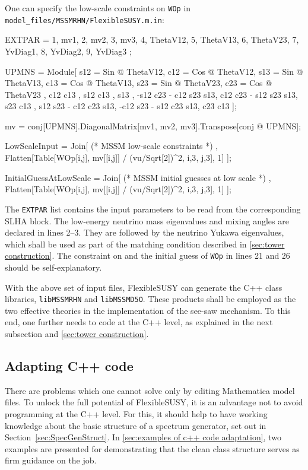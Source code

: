 \documentclass[final,3p,11pt,pdflatex]{elsarticle}
\makeatletter
\newcommand{\fs}{FlexibleSUSY\@\xspace}
\newcommand{\mathematica}{Mathematica\xspace}
\newcommand{\code}[1]{\lstinline|#1|}  %
\newcommand{\secref}[1]{Section~\ref{#1}}
\makeatother
\begin{document}
One can specify the low-scale constraints on \code{WOp}
in \code{model_files/MSSMRHN/FlexibleSUSY.m.in}:
\begin{numlstlisting}
EXTPAR = {
  {1, mv1}, {2, mv2}, {3, mv3},
  {4, ThetaV12}, {5, ThetaV13}, {6, ThetaV23},
  {7, YvDiag1}, {8, YvDiag2}, {9, YvDiag3}
};

UPMNS = Module[{
    s12 = Sin @ ThetaV12, c12 = Cos @ ThetaV12,
    s13 = Sin @ ThetaV13, c13 = Cos @ ThetaV13,
    s23 = Sin @ ThetaV23, c23 = Cos @ ThetaV23
  },
  {{  c12 c13              ,  s12 c13              , s13     },
   { -s12 c23 - c12 s23 s13,  c12 c23 - s12 s23 s13, s23 c13 },
   {  s12 s23 - c12 c23 s13, -c12 s23 - s12 c23 s13, c23 c13 }}
];

mv = conj[UPMNS].DiagonalMatrix[{mv1, mv2, mv3}].Transpose[conj @ UPMNS];

LowScaleInput = Join[
  { (* MSSM low-scale constraints *) },
  Flatten[Table[{WOp[i,j], mv[[i,j]] / (vu/Sqrt[2])^2}, {i,3}, {j,3}], 1]
];

InitialGuessAtLowScale = Join[
  { (* MSSM initial guesses at low scale *) },
  Flatten[Table[{WOp[i,j], mv[[i,j]] / (vu/Sqrt[2])^2}, {i,3}, {j,3}], 1]
];
\end{numlstlisting}
The \code{EXTPAR} list contains the input parameters
to be read from the corresponding SLHA block.
The low-energy neutrino mass eigenvalues and mixing angles are
declared in lines 2--3.
They are followed by the neutrino Yukawa eigenvalues,
which shall be used as part of the matching condition
described in \ref{sec:tower construction}.
The constraint on and the initial guess of \code{WOp}
in lines 21 and 26 should be self-explanatory.

With the above set of input files,
\fs can generate the C++ class libraries,
\code{libMSSMRHN} and \code{libMSSMD5O}\@.
These products shall be employed as the two effective theories
in the implementation of the see-saw mechanism.
To this end, one further needs to code at the C++ level,
as explained in the next subsection and \ref{sec:tower construction}.

\subsection{Adapting C++ code}
\label{sec:adapting-cpp-code}

There are problems which one cannot solve only by
editing \mathematica model files.
To unlock the full potential of \fs,
it is an advantage not to avoid programming at the C++ level.
For this, it should help to have working knowledge about the basic structure
of a spectrum generator, set out in \secref{sec:SpecGenStruct}.
In \ref{sec:examples of c++ code adaptation},
two examples are presented for demonstrating that
the clean class structure serves as firm guidance on the job.
\end{document}
